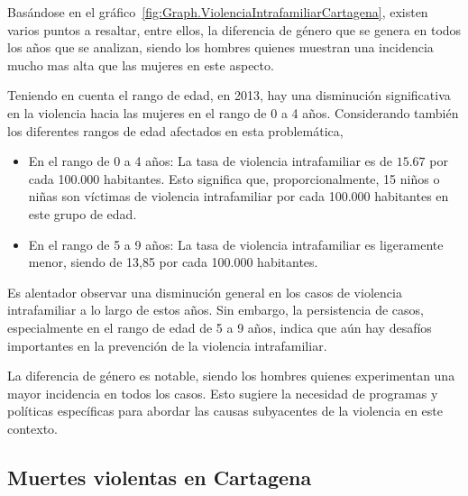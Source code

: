 \documentclass[letterpaper, 12pt]{article}
\begin{document}
Basándose en el
gráfico~\ref{fig:Graph.ViolenciaIntrafamiliarCartagena},
existen varios puntos a resaltar, entre ellos, la
diferencia de género que se genera en todos los años que se
analizan, siendo los hombres quienes muestran una
incidencia mucho mas alta que las mujeres en este aspecto.

Teniendo en cuenta el rango de edad, en 2013, hay una
disminución significativa en la violencia hacia las mujeres
en el rango de 0 a 4 años. Considerando también los
diferentes rangos de edad afectados en esta problemática,

\begin{itemize}[label=$\diamond$]
    \item En el rango de 0 a 4 años: La tasa de violencia
          intrafamiliar es de $15.67$ por cada 100.000 habitantes.
          Esto significa que, proporcionalmente, 15 niños o niñas son
          víctimas de violencia intrafamiliar por cada 100.000
          habitantes en este grupo de edad.


    \item En el rango de 5 a 9 años: La tasa de violencia
          intrafamiliar es ligeramente menor, siendo de 13,85 por
          cada 100.000 habitantes.
\end{itemize}


Es alentador observar una disminución general en los casos
de violencia intrafamiliar a lo largo de estos años. Sin
embargo, la persistencia de casos, especialmente en el
rango de edad de 5 a 9 años, indica que aún hay desafíos
importantes en la prevención de la violencia intrafamiliar.

La diferencia de género es notable, siendo los hombres
quienes experimentan una mayor incidencia en todos los
casos. Esto sugiere la necesidad de programas y políticas
específicas para abordar las causas subyacentes de la
violencia en este contexto.


\subsection*{Muertes violentas en Cartagena}
\end{document}
